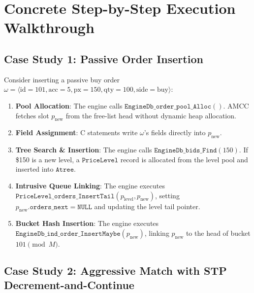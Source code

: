 \documentclass[11pt,a4paper]{article}
\begin{document}
\section{Concrete Step-by-Step Execution Walkthrough}
\label{sec:walkthrough}

\subsection{Case Study 1: Passive Order Insertion}

Consider inserting a passive buy order $\omega = \langle \text{id}=101, \text{acc}=5, \text{px}=150, \text{qty}=100, \text{side}=\text{buy} \rangle$:
\begin{enumerate}[leftmargin=*]
    \item \textbf{Pool Allocation}: The engine calls $\mathtt{EngineDb\_order\_pool\_Alloc}()$. AMCC fetches slot $p_{\text{new}}$ from the free-list head without dynamic heap allocation.
    \item \textbf{Field Assignment}: C statements write $\omega$'s fields directly into $p_{\text{new}}$.
    \item \textbf{Tree Search \& Insertion}: The engine calls $\mathtt{EngineDb\_bids\_Find}(150)$. If \$150 is a new level, a $\mathtt{PriceLevel}$ record is allocated from the level pool and inserted into $\mathtt{Atree}$.
    \item \textbf{Intrusive Queue Linking}: The engine executes $\mathtt{PriceLevel\_orders\_InsertTail}(p_{\text{level}}, p_{\text{new}})$, setting $p_{\text{new}}.\mathtt{orders\_next} = \mathtt{NULL}$ and updating the level tail pointer.
    \item \textbf{Bucket Hash Insertion}: The engine executes $\mathtt{EngineDb\_ind\_order\_InsertMaybe}(p_{\text{new}})$, linking $p_{\text{new}}$ to the head of bucket $101 \pmod M$.
\end{enumerate}

\subsection{Case Study 2: Aggressive Match with STP Decrement-and-Continue}
\end{document}

